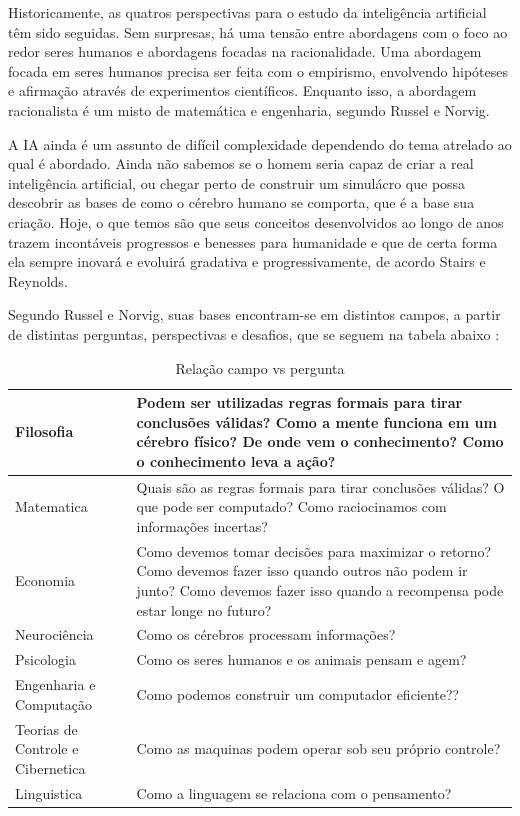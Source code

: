 Historicamente, as quatros perspectivas para o estudo da inteligência artificial têm sido seguidas. Sem surpresas, há uma tensão entre abordagens com o foco ao redor seres humanos e abordagens focadas na racionalidade. Uma abordagem focada em seres humanos precisa ser feita com o empirismo, envolvendo hipóteses e afirmação através de experimentos científicos. Enquanto isso, a abordagem racionalista é um misto de matemática e engenharia, segundo Russel e Norvig\cite{russelnorvig}.

A \acrshort{IA} ainda é um assunto de difícil complexidade dependendo do tema atrelado ao qual é abordado. Ainda não sabemos se o homem seria capaz de criar a real inteligência artificial, ou chegar perto de construir um simulácro que possa descobrir as bases de como o cérebro humano se comporta, que é a base sua criação. Hoje, o que temos são que seus conceitos desenvolvidos ao longo de anos trazem incontáveis progressos e benesses para humanidade e que de certa forma ela sempre inovará e evoluirá gradativa e progressivamente, de acordo Stairs e Reynolds\cite{reynoldsstair}.

Segundo Russel e Norvig, suas bases encontram-se em distintos campos, a partir de distintas perguntas, perspectivas e desafios, que se seguem na tabela abaixo \cite{russelnorvig}:

\begin{table}[h!]
    \centering
    \caption{Relação campo vs pergunta \cite{russelnorvig}}
    \small
    \begin{tabular}{p{3cm} | p{12cm}}
        \hline
        Filosofia & Podem ser utilizadas regras formais para tirar conclusões válidas? Como a mente funciona em um cérebro físico? De onde vem o conhecimento? Como o conhecimento leva a ação?\\ 
        \hline
        Matematica & Quais são as regras formais para tirar conclusões válidas? O que pode ser computado? Como raciocinamos com informações incertas?\\
        \hline
        Economia & Como devemos tomar decisões para maximizar o retorno? Como devemos fazer isso quando outros não podem ir junto? Como devemos fazer isso quando a recompensa pode estar longe no futuro?\\
        \hline
        Neurociência & Como os cérebros processam informações?\\
        \hline
        Psicologia & Como os seres humanos e os animais pensam e agem?\\
        \hline
        Engenharia e Computação & Como podemos construir um computador eficiente??\\
        \hline
        Teorias de Controle e Cibernetica & Como as maquinas podem operar sob seu próprio controle?\\
        \hline
        Linguistica & Como a linguagem se relaciona com o pensamento? \\
        \hline
    \end{tabular}
    \label{table:2}
\end{table}

